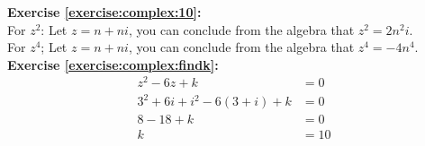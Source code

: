 \noindent\textbf{Exercise \ref{exercise:complex:10}:} \\
For $z^{2}$: Let $z = n + ni$, you can conclude from the algebra that $z^{2} = 2n^{2}i$. \\
For $z^{4}$; Let $z = n + ni$, you can conclude from the algebra that $z^{4} = -4n^{4}$. \\

\noindent\textbf{Exercise \ref{exercise:complex:findk}:}
\begin{align*}
z^{2} - 6z + k &= 0\\
3^{2} + 6i + i^{2} - 6(3 + i) + k &= 0\\
8 - 18 + k &= 0\\
k &= 10
\end{align*}

